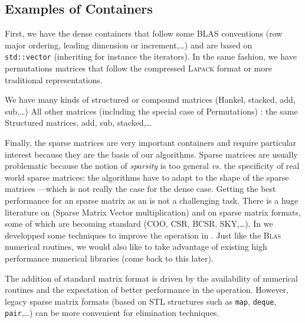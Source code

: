 \subsection{Examples of Containers}
%
First, we have the dense containers that follow some BLAS conventions (row
major ordering, leading dimension or increment,\ldots) and are based on {\tt
std::vector} (inheriting for instance the iterators). In the same fashion, we
have permutations matrices that follow the compressed \textsc{Lapack} format or
more traditional representations.
%
\par
%
We have many kinds of structured or compound matrices (Hankel, stacked, add, sub,\ldots)
All other matrices (including the special case of Permutations) : the same
Structured matrices, add, sub, stacked,\dots
%
\par
%
Finally, the sparse matrices are very important containers and require
particular interest because they are the basis of our \applin algorithms.
%
%
Sparse matrices are usually problematic because the notion of \emph{sparsity}
is too general \emph{vs.} the specificity of real world sparse matrices: the
algorithms have to adapt to the shape of the sparse matrices ---which is not really the case
for the dense case.
%
Getting the best performance for an sparse matrix as an \applin is not a
challenging task. There is a huge literature on \spmv (Sparse Matrix Vector
multiplication) and on sparse matrix formats, some of which are becoming
standard (COO, CSR, BCSR, SKY,\ldots).  In \cite{Boyer:2010:spmv} we developped
some techniques to improve the \spmv operation in \linbox.
Just like the \textsc{Blas} numerical
routines, we would also like to take advantage of existing high performance
numerical libraries (come back to this later).
%
\par
%
The addition of standard matrix format is driven by the availability of
numerical routines and the expectation of better performance in the \spmv
operation. However, legacy \linbox sparse matrix formats (based on STL
structures such as {\tt map}, {\tt deque}, {\tt pair},\ldots) can be more
convenient for elimination techniques.
%
%
\par
%
%
%
